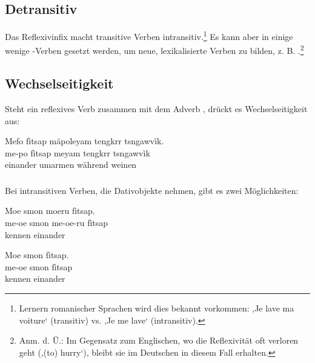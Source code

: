 \subsection{Detransitiv} Das Reflexivinfix macht transitive Verben intransitiv.\footnote{Lernern romanischer Sprachen wird dies bekannt vorkommen: ,Je lave ma voiture‘ (transitiv) vs. ,Je me lave‘ (intransitiv).} Es kann aber in einige wenige -Verben gesetzt werden, um neue, lexikalisierte Verben zu bilden, z. B.  .\footnote{Anm. d. Ü.: Im Gegensatz zum Englischen, wo die Reflexivität oft verloren geht (,(to) hurry‘), bleibt sie im Deutschen in diesem Fall erhalten.}\label{syn:reflexive}

\subsection{Wechselseitigkeit} Steht ein reflexives Verb zusammen mit dem Adverb  , drückt es Wechselseitigkeit aus:

\begin{interlin}
	\glll \Npawl{}Mefo fìtsap mäpoleyam tengkrr tsngawvìk. \\
	me-po fìtsap meyam tengkrr tsngawvìk \\
	 einander umarmen während weinen \\
\end{interlin}

\subsubsection{} Bei intransitiven Verben, die Dativobjekte nehmen, gibt es zwei Möglichkeiten:

\begin{interlin}
	\glll \Npawl{}Moe smon moeru fìtsap. \\
	me-oe smon me-oe-ru fìtsap \\
	 kennen  einander \\
\end{interlin}

\begin{interlin}
	\glll \Npawl{}Moe smon fìtsap. \\
	me-oe smon fìtsap \\
	 kennen einander \\
\end{interlin}

